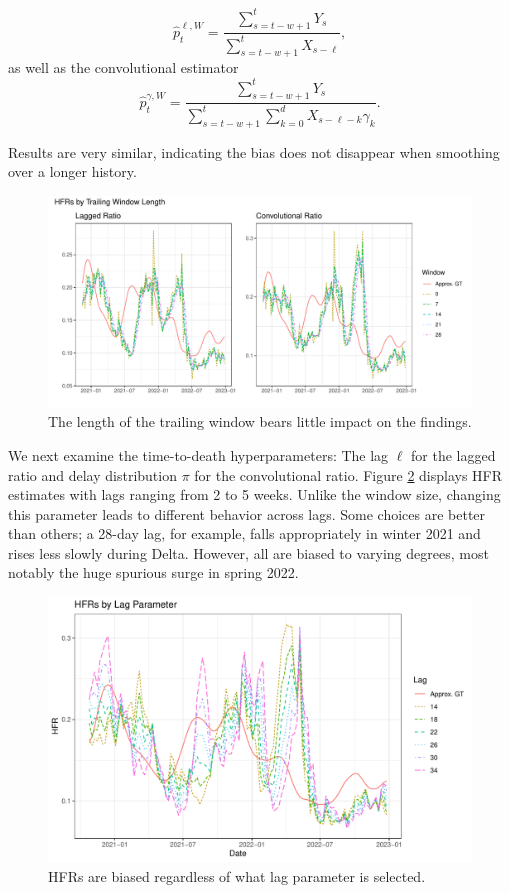 \documentclass{article}
\renewcommand{\hat}{\widehat} %
\begin{document}
\begin{equation}\label{eq:laggedSmooth}
    \hat{p}_t^{\ell, W} = \frac{\sum_{s=t-w+1}^{t} Y_s}{\sum_{s=t-w+1}^{t} X_{s-\ell}},
\end{equation}
\noindent as well as the convolutional estimator
\begin{equation}\label{eq:convSmooth}
    \hat{p}_t^{\gamma, W} = \frac{\sum_{s=t-w+1}^{t} Y_s}{\sum_{s=t-w+1}^{t} \sum_{k=0}^d X_{s-\ell-k}\gamma_k}.
\end{equation}

\noindent Results are very similar, indicating the bias does not disappear when smoothing over a longer history. 

\begin{figure}
    \centering
    \includegraphics[width=0.75\linewidth]{Figs/Real/window_size.pdf}
    \caption{The length of the trailing window bears little impact on the findings.}
    \label{fig:window}
\end{figure}

We next examine the time-to-death hyperparameters: The lag $\ell$ for the lagged ratio and delay distribution $\pi$ for the convolutional ratio. Figure \ref{fig:lag} displays HFR estimates with lags ranging from 2 to 5 weeks. Unlike the window size, changing this parameter leads to different behavior across lags. Some choices are better than others; a 28-day lag, for example, falls appropriately in winter 2021 and rises less slowly during Delta. However, all are biased to varying degrees, most notably the huge spurious surge in spring 2022.

\begin{figure}
    \centering
    \includegraphics[width=0.7\linewidth]{Figs/Real/hfrs_by_lag.pdf}
    \caption{HFRs are biased regardless of what lag parameter is selected.}
    \label{fig:lag}
\end{figure}
\end{document}
